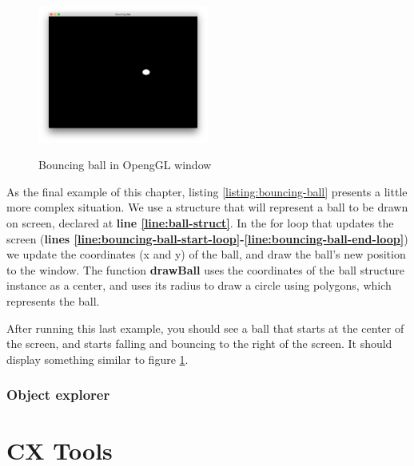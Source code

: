 \documentclass[11pt,fleqn,openany]{book} %
\begin{document}
\begin{figure}
\caption{Bouncing ball in OpengGL window}
\centering
\includegraphics[width=0.5\textwidth]{img/bouncing-ball.png}
\label{figure:bouncing-ball}
\end{figure}

As the final example of this chapter, listing \ref{listing:bouncing-ball} presents a little more complex situation. We use a structure that will represent a ball to be drawn on screen, declared at \textbf{line \ref{line:ball-struct}}. In the for loop that updates the screen (\textbf{lines \ref{line:bouncing-ball-start-loop}-\ref{line:bouncing-ball-end-loop}}) we update the coordinates (x and y) of the ball, and draw the ball's new position to the window. The function \textbf{drawBall} uses the coordinates of the ball structure instance as a center, and uses its radius to draw a circle using polygons, which represents the ball.

After running this last example, you should see a ball that starts at the center of the screen, and starts falling and bouncing to the right of the screen. It should display something similar to figure \ref{figure:bouncing-ball}.

\section{Object explorer}
\label{section:library-explorer}



\part{CX Tools}

\end{document}
